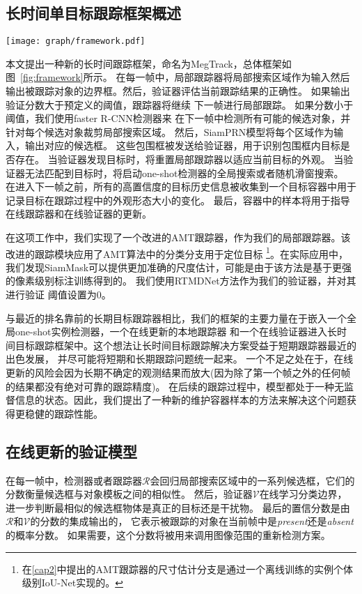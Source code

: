 \documentclass[promaster]{thesis-uestc}
\begin{document}
\subsection{长时间单目标跟踪框架概述}
\begin{figure*}[htp!]
	\centering  
	\texttt{[image: graph/framework.pdf]}
    \caption{本文提出的长时间单目标跟踪系统框架。}
	\label{fig:framework}
\end{figure*}
本文提出一种新的长时间跟踪框架，命名为MegTrack，总体框架如图~\ref{fig:framework}所示。
在每一帧中，局部跟踪器将局部搜索区域作为输入然后输出被跟踪对象的边界框。然后，验证器评估当前跟踪结果的正确性。
如果输出验证分数大于预定义的阈值，跟踪器将继续
下一帧进行局部跟踪。
如果分数小于阈值，我们使用faster R-CNN检测器\cite{fasterrcnn2015}来
在下一帧中检测所有可能的候选对象，并针对每个候选对象裁剪局部搜索区域。
然后，SiamPRN\cite{siamrpn++}模型将每个区域作为输入，输出对应的候选框。
这些包围框被发送给验证器，用于识别包围框内目标是否存在。
当验证器发现目标时，将重置局部跟踪器以适应当前目标的外观。
当验证器无法匹配到目标时，将启动one-shot检测器的全局搜索或者随机滑窗搜索。
在进入下一帧之前，所有的高置信度的目标历史信息被收集到一个目标容器中用于记录目标在跟踪过程中的外观形态大小的变化。
最后，容器中的样本将用于指导在线跟踪器和在线验证器的更新。

在这项工作中，我们实现了一个改进的AMT跟踪器，作为我们的局部跟踪器。该改进的跟踪模块应用了AMT算法中的分类分支用于定位目标
\footnote{在\ref{cap2}中提出的AMT跟踪器的尺寸估计分支是通过一个离线训练的实例个体级别IoU-Net实现的。}。在实际应用中，
我们发现SiamMask\cite{SiamMask}可以提供更加准确的尺度估计，可能是由于该方法是基于更强的像素级别标注训练得到的。
我们使用RTMDNet方法\cite{RTMDNet}作为我们的验证器，并对其进行验证
阈值设置为0。

与最近的排名靠前的长期目标跟踪器相比，我们的框架的主要力量在于嵌入一个全局one-shot实例检测器，一个在线更新的本地跟踪器
和一个在线验证器进入长时间目标跟踪框架中。这个想法让长时间目标跟踪解决方案受益于短期跟踪器最近的出色发展，
并尽可能将短期和长期跟踪问题统一起来。
一个不足之处在于，在线更新的风险会因为长期不确定的观测结果而放大(因为除了第一个帧之外的任何帧的结果都没有绝对可靠的跟踪精度)。
在后续的跟踪过程中，模型都处于一种无监督信息的状态。因此，我们提出了一种新的维护容器样本的方法来解决这个问题获得更稳健的跟踪性能。

\subsection{在线更新的验证模型}
在每一帧中，检测器或者跟踪器$\mathcal{R}$会回归局部搜索区域中的一系列候选框，它们的分数衡量候选框与对象模板之间的相似性。
然后，验证器$\mathcal{V}$在线学习分类边界，进一步判断最相似的候选框物体是真正的目标还是干扰物。
最后的置信分数是由$\mathcal{R}$和$\mathcal{V}$的分数的集成输出的，
它表示被跟踪的对象在当前帧中是\emph{present}还是\emph{absent}的概率分数。
如果需要，这个分数将被用来调用图像范围的重新检测方案。
\end{document}

